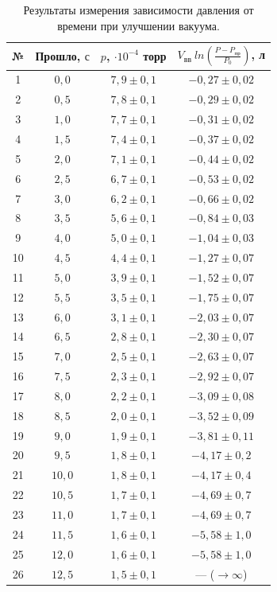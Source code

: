 \documentclass[a4paper,11pt]{article}
\begin{document}
\begin{table}[h!]
\centering
\begin{tabular}{ ||c|c|c|c|| }
  \hline
  № & Прошло, $с$ & $p$, $ \cdot 10^{-4}$ торр & $V_{вв}\ ln \left( \frac{P - P_{пр}}{P_{0}} \right)$, л \\
  \hline
  1 & $0,0$ & $7,9 \pm 0,1$ & $-0,27 \pm 0,02$ \\
  2 & $0,5$ & $7,8 \pm 0,1$ & $-0,29 \pm 0,02$ \\
  3 & $1,0$ & $7,7 \pm 0,1$ & $-0,31 \pm 0,02$ \\
  4 & $1,5$ & $7,4 \pm 0,1$ & $-0,37 \pm 0,02$ \\
  5 & $2,0$ & $7,1 \pm 0,1$ & $-0,44 \pm 0,02$ \\
  6 & $2,5$ & $6,7 \pm 0,1$ & $-0,53 \pm 0,02$ \\
  7 & $3,0$ & $6,2 \pm 0,1$ & $-0,66 \pm 0,02$ \\
  8 & $3,5$ & $5,6 \pm 0,1$ & $-0,84 \pm 0,03$ \\
  9 & $4,0$ & $5,0 \pm 0,1$ & $-1,04 \pm 0,03$ \\
  10 & $4,5$ & $4,4 \pm 0,1$ & $-1,27 \pm 0,07$ \\
  11 & $5,0$ & $3,9 \pm 0,1$ & $-1,52 \pm 0,07$ \\
  12 & $5,5$ & $3,5 \pm 0,1$ & $-1,75 \pm 0,07$ \\
  13 & $6,0$ & $3,1 \pm 0,1$ & $-2,03 \pm 0,07$ \\
  14 & $6,5$ & $2,8 \pm 0,1$ & $-2,30 \pm 0,07$ \\
  15 & $7,0$ & $2,5 \pm 0,1$ & $-2,63 \pm 0,07$ \\
  16 & $7,5$ & $2,3 \pm 0,1$ & $-2,92 \pm 0,07$ \\
  17 & $8,0$ & $2,2 \pm 0,1$ & $-3,09 \pm 0,08$ \\
  18 & $8,5$ & $2,0 \pm 0,1$ & $-3,52 \pm 0,09$ \\
  19 & $9,0$ & $1,9 \pm 0,1$ & $-3,81 \pm 0,11$ \\
  20 & $9,5$ & $1,8 \pm 0,1$ & $-4,17 \pm 0,2$ \\
  21 & $10,0$ & $1,8 \pm 0,1$ & $-4,17 \pm 0,4$ \\
  22 & $10,5$ & $1,7 \pm 0,1$ & $-4,69 \pm 0,7$ \\
  23 & $11,0$ & $1,7 \pm 0,1$ & $-4,69 \pm 0,7$ \\
  24 & $11,5$ & $1,6 \pm 0,1$ & $-5,58 \pm 1,0$ \\
  25 & $12,0$ & $1,6 \pm 0,1$ & $-5,58 \pm 1,0$ \\
  26 & $12,5$ & $1,5 \pm 0,1$ & --- ($\rightarrow\infty$) \\
  \hline
\end{tabular}
\caption{Результаты измерения зависимости давления от времени при улучшении вакуума.}
\label{table:tab1}
\end{table}
\end{document}
